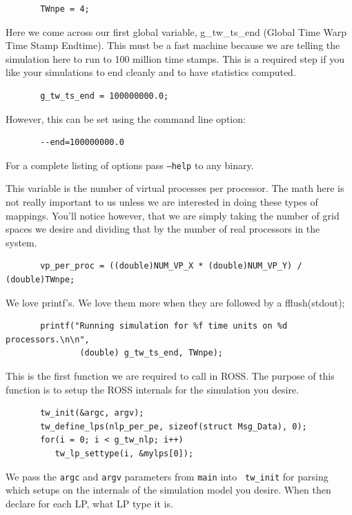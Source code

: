 \documentclass[12pt]{article}
\begin{document}
\begin{verbatim}
       TWnpe = 4;
\end{verbatim}

Here we come across our first global variable, g\_tw\_ts\_end (Global
Time Warp Time Stamp Endtime).  This must be a fast machine because we
are telling the simulation here to run to 100 million time stamps.
This is a required step if you like your simulations to end cleanly
and to have statistics computed.

\begin{verbatim}
       g_tw_ts_end = 100000000.0;
\end{verbatim}

However, this can be set using the command line option:

\begin{verbatim}
       --end=100000000.0
\end{verbatim}

For a complete listing of options pass {\tt --help} to any binary.

This variable is the number of virtual processes per processor. The math here
is not really important to us unless we are interested in doing these types of
mappings.  You'll notice however, that we are simply taking the number of grid
spaces we desire and dividing that by the number of real processors in the
system.
 
\begin{verbatim}
       vp_per_proc = ((double)NUM_VP_X * (double)NUM_VP_Y) / (double)TWnpe;
\end{verbatim}

We love printf's.  We love them more when they are followed by a fflush(stdout);
 
\begin{verbatim}
       printf("Running simulation for %f time units on %d processors.\n\n", 
               (double) g_tw_ts_end, TWnpe);
\end{verbatim}
 
This is the first function we are required to call in ROSS.  The
purpose of this function is to setup the ROSS internals for the
simulation you desire.  

\begin{verbatim}
       tw_init(&argc, argv);
       tw_define_lps(nlp_per_pe, sizeof(struct Msg_Data), 0);
       for(i = 0; i < g_tw_nlp; i++)
          tw_lp_settype(i, &mylps[0]);
\end{verbatim}
 
We pass the {\tt argc} and {\tt argv} parameters from {\tt main} into {\tt
  tw\_init} for parsing which setups on the internals of the simulation model
you desire. When then declare for each LP, what LP type it is.
\end{document}
